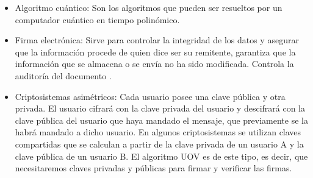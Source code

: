 \begin{itemize}
	\item Algoritmo cuántico: Son los algoritmos que pueden ser resueltos por un computador cuántico en tiempo polinómico.

	

 	\item Firma electrónica: Sirve para controlar la integridad de los datos y asegurar que la información procede de quien dice ser su remitente, garantiza que la información que se almacena o se envía no ha sido modificada. Controla la auditoría del documento \cite{firmaDigital}. 


	\item Criptosistemas asimétricos: Cada usuario posee una clave pública y otra privada. El usuario cifrará con la clave privada del usuario y descifrará con la clave pública del usuario que haya mandado el mensaje, que previamente se la habrá mandado a dicho usuario. En algunos criptosistemas se utilizan claves compartidas que se calculan a partir de la clave privada de un usuario A y la clave pública de un usuario B. El algoritmo UOV es de este tipo, es decir, que necesitaremos claves privadas y públicas para firmar y verificar las firmas.


	




\end{itemize}



